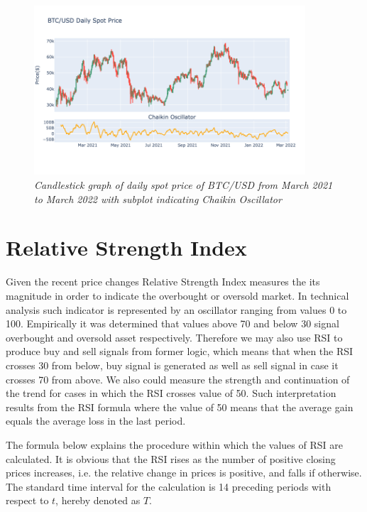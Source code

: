 \begin{figure}[ht]

\begin{center}
	\includegraphics[width=0.9\textwidth]{Chaikin.png}
\end{center}

\caption{\textit{ Candlestick graph of daily spot price of BTC/USD from March 2021 to March 2022 with subplot indicating Chaikin Oscillator}}

\end{figure}


\section{Relative Strength Index}

Given the recent price changes Relative Strength Index measures the its magnitude in order to indicate the overbought or oversold market. In technical analysis such indicator is represented by an oscillator ranging from values 0 to 100. Empirically 
it was determined that values above 70 and below 30 signal overbought and oversold asset respectively. Therefore we may also use RSI to produce buy and sell signals from former logic, which means that when the RSI crosses 30 from below, buy signal is generated as well as sell signal in case it crosses 70 from above. We also could measure the strength and continuation of the trend for cases in which the RSI crosses value of 50. Such interpretation results from the RSI formula where the value of 50 means that the average gain equals the average loss in the last period.

The formula below explains the procedure within which the values of RSI are calculated. It is obvious that the RSI rises as the number of positive closing prices increases, i.e. the relative change in prices is positive, and falls if otherwise. The standard time interval for  the calculation is 14 preceding periods with respect to $t$, hereby denoted as $T$.

